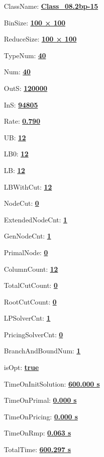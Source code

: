 \documentclass[11pt]{article}
\begin{document}
\pagestyle{empty}


ClassName: \underline{\textbf{Class_08.2bp-15}}
\par
BinSize: \underline{\textbf{100 × 100}}
\par
ReduceSize: \underline{\textbf{100 × 100}}
\par
TypeNum: \underline{\textbf{40}}
\par
Num: \underline{\textbf{40}}
\par
OutS: \underline{\textbf{120000}}
\par
InS: \underline{\textbf{94805}}
\par
Rate: \underline{\textbf{0.790}}
\par
UB: \underline{\textbf{12}}
\par
LB0: \underline{\textbf{12}}
\par
LB: \underline{\textbf{12}}
\par
LBWithCut: \underline{\textbf{12}}
\par
NodeCut: \underline{\textbf{0}}
\par
ExtendedNodeCnt: \underline{\textbf{1}}
\par
GenNodeCnt: \underline{\textbf{1}}
\par
PrimalNode: \underline{\textbf{0}}
\par
ColumnCount: \underline{\textbf{12}}
\par
TotalCutCount: \underline{\textbf{0}}
\par
RootCutCount: \underline{\textbf{0}}
\par
LPSolverCnt: \underline{\textbf{1}}
\par
PricingSolverCnt: \underline{\textbf{0}}
\par
BranchAndBoundNum: \underline{\textbf{1}}
\par
isOpt: \underline{\textbf{true}}
\par
TimeOnInitSolution: \underline{\textbf{600.000 s}}
\par
TimeOnPrimal: \underline{\textbf{0.000 s}}
\par
TimeOnPricing: \underline{\textbf{0.000 s}}
\par
TimeOnRmp: \underline{\textbf{0.063 s}}
\par
TotalTime: \underline{\textbf{600.297 s}}
\par
\newpage


\end{document}
